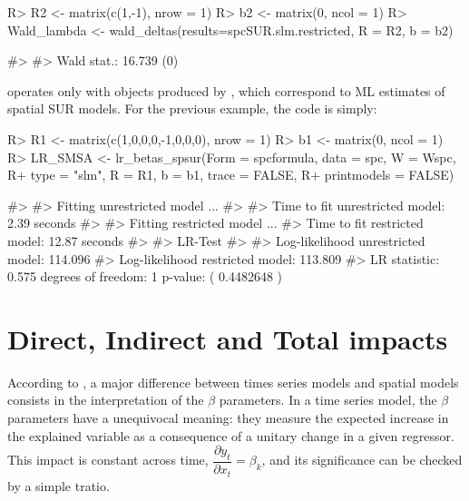 \documentclass[article]{jss}
\begin{document}
\begin{CodeChunk}

\begin{CodeInput}
R> R2 <- matrix(c(1,-1), nrow = 1)
R> b2 <- matrix(0, ncol = 1)
R> Wald_lambda <- wald_deltas(results=spcSUR.slm.restricted, R = R2, b = b2)
\end{CodeInput}

\begin{CodeOutput}
#> 
#>  Wald stat.: 16.739 (0)
\end{CodeOutput}
\end{CodeChunk}

 operates only with objects produced by , which correspond to ML estimates of spatial SUR models. For the previous example, the code is simply:

\begin{CodeChunk}

\begin{CodeInput}
R> R1 <- matrix(c(1,0,0,0,-1,0,0,0), nrow = 1)
R> b1 <- matrix(0, ncol = 1)
R> LR_SMSA <- lr_betas_spsur(Form = spcformula, data = spc, W = Wspc,
R+                            type = "slm", R = R1, b = b1, trace = FALSE,
R+                            printmodels = FALSE)
\end{CodeInput}

\begin{CodeOutput}
#> 
#>  Fitting unrestricted model ... 
#> 
#>  Time to fit unrestricted model:  2.39  seconds
#> 
#>  Fitting restricted model ... 
#> Time to fit restricted model:  12.87  seconds
#> 
#>  LR-Test 
#> 
#>  Log-likelihood unrestricted model:  114.096
#>  Log-likelihood restricted model:  113.809
#>  LR statistic:  0.575  degrees of freedom:  1  p-value: ( 0.4482648 )
\end{CodeOutput}
\end{CodeChunk}

\hypertarget{impacts}{%
\section{Direct, Indirect and Total impacts}\label{impacts}}

According to \citet{LeSage2009}, a major difference between times series models and spatial models consists in the interpretation of the \(\beta\) parameters. In a time series model, the \(\beta\) parameters have a unequivocal meaning: they measure the expected increase in the explained variable as a consequence of a unitary change in a given regressor. This impact is constant across time, \(\dfrac{\partial y_{t}}{\partial x_{t}} = \beta_{k}\), and its significance can be checked by a simple tratio.
\end{document}
